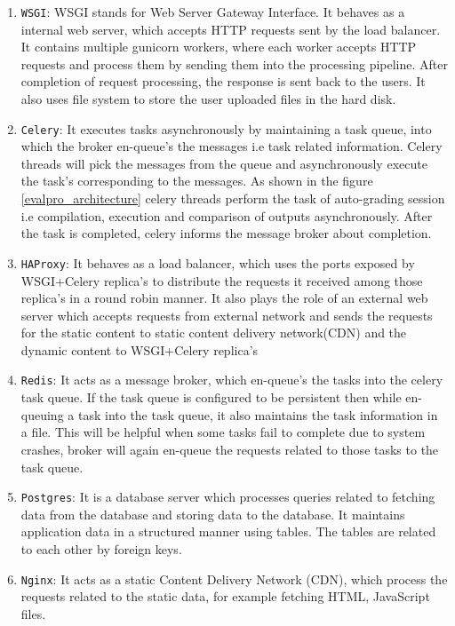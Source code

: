 \documentclass[sigconf]{acmart}
\begin{document}
\begin{enumerate}
\item {\texttt{WSGI}}: WSGI stands for Web Server Gateway Interface. It behaves as a internal web server, which accepts HTTP requests sent by
the load balancer. It contains multiple gunicorn workers, where each worker accepts
HTTP requests and process them by sending them into the processing pipeline. 
After completion of request processing, the response is sent back to the users. It also uses file system to store the user uploaded files in the hard disk. 
\item {\texttt{Celery}}: It executes tasks asynchronously by maintaining a task queue, into which the broker en-queue’s the messages i.e task related information. Celery threads will
pick the messages from the queue and asynchronously execute the task’s corresponding to the messages. As shown in the figure \ref{evalpro_architecture} celery threads perform the task of auto-grading session i.e compilation, execution and comparison of outputs asynchronously.  After the task is completed, celery informs the message broker about completion.
\item {\texttt{HAProxy}}: It behaves as a load balancer, which uses the ports exposed by WSGI+Celery replica’s to distribute the requests it received among those replica’s
in a round robin manner. It also plays the role of an external web server which accepts requests from external network and sends the requests for the static content
to static content delivery network(CDN) and the dynamic content to WSGI+Celery
replica’s
\item {\texttt{Redis}}: It acts as a message broker, which en-queue’s the tasks into the celery task queue. If the task queue is configured to be persistent then while en-queuing a task into the task queue, it also maintains the task information in a file. This will be helpful when some tasks fail to complete due to system crashes, broker will again en-queue the requests related to those tasks to the task queue.
\item {\texttt{Postgres}}: It is a database server which processes queries related to fetching data from the database and storing data to the database. It maintains application data in a structured manner using tables. The tables are related to each other by foreign keys.
\item {\texttt{Nginx}}: It acts as a static Content Delivery Network (CDN), which process the requests related to the static data, for example fetching HTML, JavaScript files.

\end{enumerate}
\end{document}
